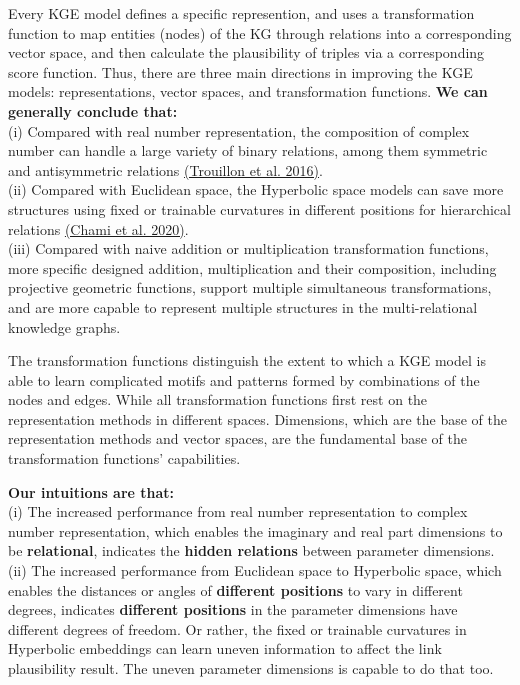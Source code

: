\documentclass[9pt]{ctexart}
\theoremstyle{definition}
\begin{document}
Every KGE model defines a specific represention, and uses a transformation function to map entities (nodes) of the KG through relations into a corresponding vector space, and then calculate the plausibility of triples via a corresponding score function.
Thus, there are three main directions in improving the KGE models: representations, vector spaces, and transformation functions.
\textbf{We can generally conclude that:}\\
(i) Compared with real number representation, the composition of complex number can handle a large variety of binary relations, among them symmetric and antisymmetric relations
\hyperlink{Tro16}{(Trouillon et al. 2016)}.\\
(ii) Compared with Euclidean space, the Hyperbolic space models can save more structures using fixed or trainable curvatures in different positions for hierarchical relations
\hyperlink{Cha20}{(Chami et al. 2020)}.\\
(iii) Compared with naive addition or multiplication transformation functions, more specific designed addition, multiplication and their composition, including projective geometric functions, 
support multiple simultaneous transformations, and are more capable to represent multiple structures in the multi-relational knowledge graphs.

The transformation functions distinguish the extent to which a KGE model is able to learn complicated motifs and patterns formed by combinations of the nodes and edges.
While all transformation functions first rest on the representation methods in different spaces.
Dimensions, which are the base of the representation methods and vector spaces, are the fundamental base of the transformation functions' capabilities.

\textbf{Our intuitions are that:}\\ 
(i) The increased performance from real number representation to complex number representation, which enables the imaginary and real part dimensions to be \textbf{relational}, indicates the \textbf{hidden relations} between parameter dimensions.\\
(ii) The increased performance from Euclidean space to Hyperbolic space, which enables the distances or angles of \textbf{different positions} to vary in different degrees, indicates \textbf{different positions} in the parameter dimensions have different degrees of freedom. 
Or rather, the fixed or trainable curvatures in Hyperbolic embeddings can learn uneven information to affect the link plausibility result. The uneven parameter dimensions is capable to do that too.
\end{document}
